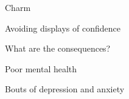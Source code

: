 \documentclass[aspectratio=169]{beamer}
\begin{document}
\begin{frame}
  \begin{center}
    \Huge Charm
    \\ \small \cite{clanceimes78}
  \end{center}
\end{frame}

\begin{frame}
  \begin{center}
    \Huge Avoiding displays of confidence
    \\ \small \cite{clanceimes78}
  \end{center}
\end{frame}

\begin{frame}
  \begin{center}
    \Huge What are the consequences?
  \end{center}
\end{frame}

\begin{frame}
  \begin{center}
    \Huge Poor mental health
    \\ \small \cite{sakulku11}
  \end{center}
\end{frame}

\begin{frame}
  \begin{center}
    \Huge Bouts of depression and anxiety
    \\ \small \cite{hh15}
  \end{center}
\end{frame}
\end{document}
